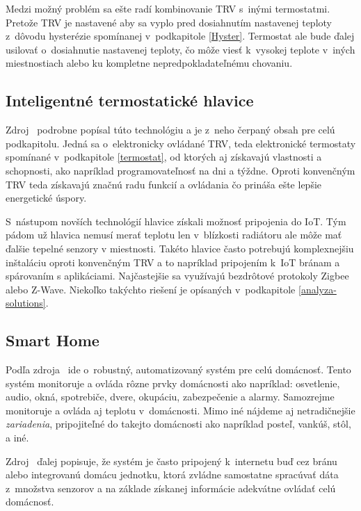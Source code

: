Medzi možný problém sa ešte radí kombinovanie TRV s~inými termostatmi. 
Pretože TRV je nastavené aby sa vyplo pred dosiahnutím nastavenej teploty z~dôvodu hysterézie spomínanej v~podkapitole \ref{Hyster}. 
Termostat ale bude ďalej usilovať o~dosiahnutie nastavenej teploty, čo môže viesť k~vysokej teplote v~iných miestnostiach alebo ku kompletne nepredpokladateľnému chovaniu.

\subsection{Inteligentné termostatické hlavice}\label{smart-termo}
Zdroj~\cite{morris_2022} podrobne popísal túto technológiu a je z~neho čerpaný obsah pre celú podkapitolu.
Jedná sa o~elektronicky ovládané TRV, teda elektronické termostaty spomínané v~podkapitole \ref{termostat}, od ktorých aj získavajú vlastnosti a schopnosti, ako napríklad programovateľnosť na dni a týždne. 
Oproti konvenčným TRV teda získavajú značnú radu funkcií a ovládania čo prináša ešte lepšie energetické úspory. 

S~nástupom novších technológií hlavice získali možnosť pripojenia do IoT. 
Tým pádom už hlavica nemusí merať teplotu len v~blízkosti radiátoru ale môže mať ďalšie tepelné senzory v miestnosti. 
Takéto hlavice často potrebujú komplexnejšiu inštaláciu oproti konvenčným TRV a to napríklad pripojením k~IoT bránam a spárovaním s aplikáciami.
Najčastejšie sa využívajú bezdrôtové protokoly Zigbee alebo Z-Wave.
Niekoľko takýchto riešení je opísaných v~podkapitole \ref{analyza-solutions}.

\subsection{Smart Home}\label{smart-home}
Podľa zdroja~\cite{1382266} ide o~robustný, automatizovaný systém pre celú domácnosť. 
Tento systém monitoruje a ovláda rôzne prvky domácnosti ako napríklad: osvetlenie, audio, okná, spotrebiče, dvere, okupáciu, zabezpečenie a alarmy. 
Samozrejme monitoruje a ovláda aj teplotu v~domácnosti. 
Mimo iné nájdeme aj netradičnejšie \emph{zariadenia}, pripojiteľné do takejto domácnosti ako napríklad posteľ, vankúš, stôl, a iné.

Zdroj~\cite{1382266} ďalej popisuje, že systém je často pripojený k~internetu buď cez bránu alebo integrovanú domácu jednotku, ktorá zvládne samostatne spracúvať dáta z~množstva senzorov a na základe získanej informácie adekvátne ovládať celú domácnosť.


